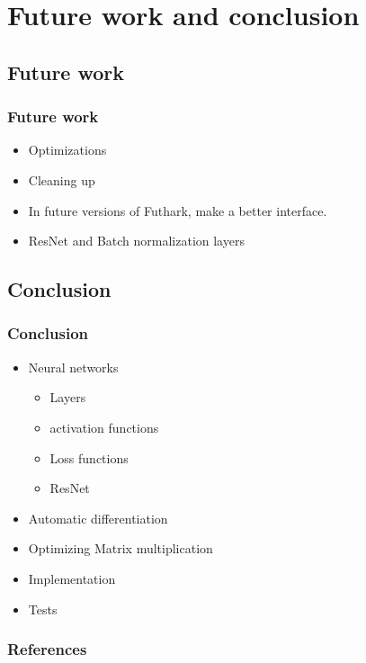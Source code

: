 \documentclass{beamer}
\begin{document}
\section{Future work and conclusion}

\subsection{Future work}

\begin{frame}
    \frametitle{Future work}

    \begin{itemize}
        \item Optimizations
        \item Cleaning up
        \item In future versions of Futhark, make a better interface.
        \item ResNet and Batch normalization layers
    \end{itemize}
\end{frame}

\subsection{Conclusion}

\begin{frame}
    \frametitle{Conclusion}
    
    \begin{itemize}
        \item Neural networks
        \begin{itemize}
            \item Layers
            \item activation functions
            \item Loss functions
            \item ResNet
        \end{itemize}
        \item Automatic differentiation
        \item Optimizing Matrix multiplication
        \item Implementation
        \item Tests
    \end{itemize}
\end{frame}

\begin{frame}
    \frametitle{References}
    
\end{frame}
\end{document}
